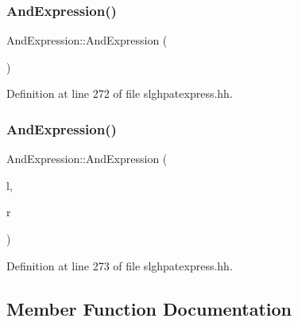 \subsubsection{\texorpdfstring{AndExpression()}{AndExpression()}\hspace{0.1cm}{\footnotesize\ttfamily [1/2]}}
{\footnotesize\ttfamily And\+Expression\+::\+And\+Expression (\begin{DoxyParamCaption}\item[{void}]{ }\end{DoxyParamCaption})\hspace{0.3cm}{\ttfamily [inline]}}



Definition at line 272 of file slghpatexpress.\+hh.

\mbox{\label{class_and_expression_a11c0a6760ebcece42effd06af8e2f3b0}} 
\subsubsection{\texorpdfstring{AndExpression()}{AndExpression()}\hspace{0.1cm}{\footnotesize\ttfamily [2/2]}}
{\footnotesize\ttfamily And\+Expression\+::\+And\+Expression (\begin{DoxyParamCaption}\item[{\mbox{\hyperlink{class_pattern_expression}{Pattern\+Expression}} $\ast$}]{l,  }\item[{\mbox{\hyperlink{class_pattern_expression}{Pattern\+Expression}} $\ast$}]{r }\end{DoxyParamCaption})\hspace{0.3cm}{\ttfamily [inline]}}



Definition at line 273 of file slghpatexpress.\+hh.



\subsection{Member Function Documentation}
\mbox{\label{class_and_expression_ae2df156ce0c2a28f3a677fed7b084d07}} 
